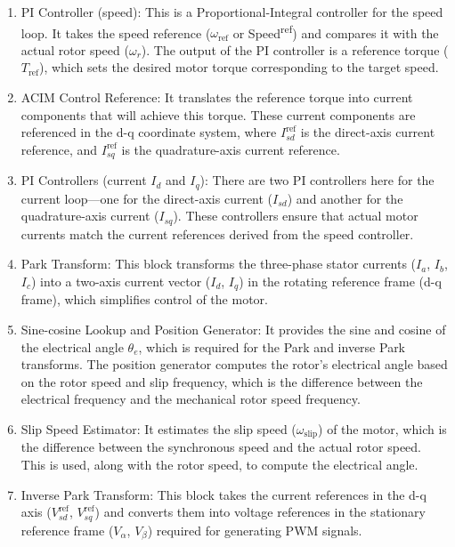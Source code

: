 \begin{enumerate}


  \item {PI Controller (speed):} This is a Proportional-Integral controller for the speed loop. It takes the speed reference ($\omega_{\text{ref}}$ or Speed\textsuperscript{ref}) and compares it with the actual rotor speed ($\omega_r$). The output of the PI controller is a reference torque ($T_{\text{ref}}$), which sets the desired motor torque corresponding to the target speed.
  
  \item {ACIM Control Reference:} It translates the reference torque into current components that will achieve this torque. These current components are referenced in the d-q coordinate system, where $I_{sd}^{\text{ref}}$ is the direct-axis current reference, and $I_{sq}^{\text{ref}}$ is the quadrature-axis current reference.
  
  \item {PI Controllers (current $I_d$ and $I_q$):} There are two PI controllers here for the current loop---one for the direct-axis current ($I_{sd}$) and another for the quadrature-axis current ($I_{sq}$). These controllers ensure that actual motor currents match the current references derived from the speed controller.
  
  \item {Park Transform:} This block transforms the three-phase stator currents ($I_a$, $I_b$, $I_c$) into a two-axis current vector ($I_d$, $I_q$) in the rotating reference frame (d-q frame), which simplifies control of the motor.
  
  \item {Sine-cosine Lookup and Position Generator:} It provides the sine and cosine of the electrical angle $\theta_e$, which is required for the Park and inverse Park transforms. The position generator computes the rotor's electrical angle based on the rotor speed and slip frequency, which is the difference between the electrical frequency and the mechanical rotor speed frequency.
  
  \item {Slip Speed Estimator:} It estimates the slip speed ($\omega_{\text{slip}}$) of the motor, which is the difference between the synchronous speed and the actual rotor speed. This is used, along with the rotor speed, to compute the electrical angle.
  
  \item {Inverse Park Transform:} This block takes the current references in the d-q axis ($V_{sd}^{\text{ref}}$, $V_{sq}^{\text{ref}}$) and converts them into voltage references in the stationary reference frame ($V_\alpha$, $V_\beta$) required for generating PWM signals.
  

\end{enumerate}
